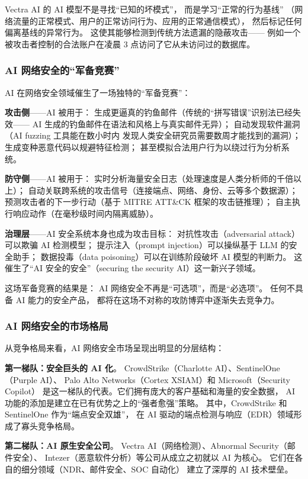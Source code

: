 Vectra AI 的 AI 模型不是寻找``已知的坏模式''，
而是学习``正常的行为基线''
（网络流量的正常模式、用户的正常访问行为、应用的正常通信模式），
然后标记任何偏离基线的异常行为。
这使其能够检测到传统方法遗漏的隐蔽攻击——
例如一个被攻击者控制的合法账户在凌晨 3 点访问了它从未访问过的数据库。

\subsubsection{AI 网络安全的``军备竞赛''}

AI 在网络安全领域催生了一场独特的``军备竞赛''：

\textbf{攻击侧}——AI 被用于：
生成更逼真的钓鱼邮件（传统的``拼写错误''识别法已经失效——
AI 生成的钓鱼邮件在语法和风格上与真实邮件无异）；
自动发现软件漏洞（AI fuzzing 工具能在数小时内
发现人类安全研究员需要数周才能找到的漏洞）；
生成变种恶意代码以规避特征检测；
甚至模拟合法用户行为以绕过行为分析系统。

\textbf{防守侧}——AI 被用于：
实时分析海量安全日志（处理速度是人类分析师的千倍以上）；
自动关联跨系统的攻击信号（连接端点、网络、身份、云等多个数据源）；
预测攻击者的下一步行动（基于 MITRE ATT\&CK 框架的攻击链推理）；
自主执行响应动作（在毫秒级时间内隔离威胁）。

\textbf{治理层}——AI 安全系统本身也成为攻击目标：
对抗性攻击（adversarial attack）可以欺骗 AI 检测模型；
提示注入（prompt injection）可以操纵基于 LLM 的安全助手；
数据投毒（data poisoning）可以在训练阶段破坏 AI 模型的判断力。
这催生了``AI 安全的安全''（securing the security AI）这一新兴子领域。

这场军备竞赛的结果是：
AI 网络安全不再是``可选项''，而是``必选项''。
任何不具备 AI 能力的安全产品，
都将在这场不对称的攻防博弈中逐渐失去竞争力。

\subsubsection{AI 网络安全的市场格局}

从竞争格局来看，AI 网络安全市场呈现出明显的分层结构：

\textbf{第一梯队：安全巨头的 AI 化}。
CrowdStrike（Charlotte AI）、SentinelOne（Purple AI）、
Palo Alto Networks（Cortex XSIAM）和 Microsoft（Security Copilot）
是这一梯队的代表。它们拥有庞大的客户基础和海量的安全数据，
AI 功能的添加是建立在已有优势之上的``强者愈强''策略。
其中，CrowdStrike 和 SentinelOne 作为``端点安全双雄''，
在 AI 驱动的端点检测与响应（EDR）领域形成了寡头竞争格局。

\textbf{第二梯队：AI 原生安全公司}。
Vectra AI（网络检测）、Abnormal Security（邮件安全）、
Intezer（恶意软件分析）等公司从成立之初就以 AI 为核心。
它们在各自的细分领域（NDR、邮件安全、SOC 自动化）
建立了深厚的 AI 技术壁垒。

